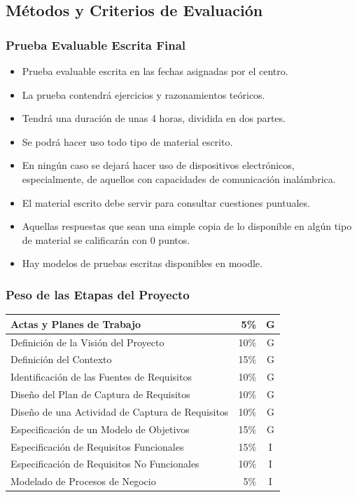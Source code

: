 \documentclass[a4paper,slidestop,xcolor=pst,dvips,blue]{beamer}
\begin{document}
\subsection{Métodos y Criterios de Evaluación}

\begin{frame}
	\frametitle{Prueba Evaluable Escrita Final}
	\begin{itemize}[<+->]
		\item Prueba evaluable escrita en las fechas asignadas por el centro.
		\item La prueba contendrá ejercicios y razonamientos teóricos.
		\item Tendrá una duración de unas 4 horas, dividida en dos partes.
        \item Se podrá hacer uso todo tipo de material escrito.
        \item En ningún caso se dejará hacer uso de dispositivos electrónicos, especialmente, de aquellos con capacidades de comunicación inalámbrica.
		\item \alert{El material escrito debe servir para consultar cuestiones puntuales}.
		\item Aquellas respuestas que sean una simple copia de lo disponible en algún tipo de material se calificarán con 0 puntos.
        \item Hay modelos de pruebas escritas disponibles en moodle.
	\end{itemize}
\end{frame}

\begin{frame}[c]
	\frametitle{Peso de las Etapas del Proyecto}
    \begin{center}
	\begin{tabular}{||l|r|c||}
    \hline \hline
    Actas y Planes de Trabajo                   &  5\% & G \\ \hline
    Definición de la Visión del Proyecto        & 10\% & G \\ \hline
    Definición del Contexto                     & 15\% & G \\ \hline
    Identificación de las Fuentes de Requisitos & 10\% & G \\ \hline
    Diseño del Plan de Captura de Requisitos    & 10\% & G \\ \hline \hline
    Diseño de una Actividad de Captura de Requisitos & 10\% & G \\ \hline
    Especificación de un Modelo de Objetivos    & 15\% & G \\ \hline
    Especificación de Requisitos Funcionales    & 15\% & I \\ \hline
    Especificación de Requisitos No Funcionales & 10\% & I \\ \hline \hline
    Modelado de Procesos de Negocio             &  5\% & I \\ \hline \hline
	\end{tabular}
\end{center}
\end{frame}
\end{document}

